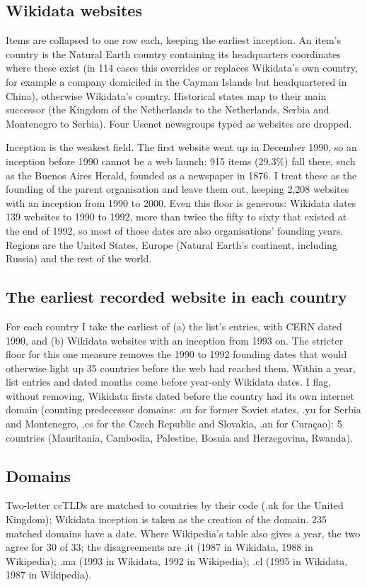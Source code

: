 \documentclass[11pt,a4paper]{article}
\begin{document}
\subsection{Wikidata websites}
Items are collapsed to one row each, keeping the earliest inception. An item's country is the Natural Earth country containing its headquarters coordinates where these exist (in 114 cases this overrides or replaces Wikidata's own country, for example a company domiciled in the Cayman Islands but headquartered in China), otherwise Wikidata's country. Historical states map to their main successor (the Kingdom of the Netherlands to the Netherlands, Serbia and Montenegro to Serbia). Four Usenet newsgroups typed as websites are dropped.

Inception is the weakest field. The first website went up in December 1990, so an inception before 1990 cannot be a web launch: 915 items (29.3\%) fall there, such as the Buenos Aires Herald, founded as a newspaper in 1876. I treat these as the founding of the parent organisation and leave them out, keeping 2,208 websites with an inception from 1990 to 2000. Even this floor is generous: Wikidata dates 139 websites to 1990 to 1992, more than twice the fifty to sixty that existed at the end of 1992, so most of those dates are also organisations' founding years. Regions are the United States, Europe (Natural Earth's continent, including Russia) and the rest of the world.

\subsection{The earliest recorded website in each country}
For each country I take the earliest of (a) the list's entries, with CERN dated 1990, and (b) Wikidata websites with an inception from 1993 on. The stricter floor for this one measure removes the 1990 to 1992 founding dates that would otherwise light up 35 countries before the web had reached them. Within a year, list entries and dated months come before year-only Wikidata dates. I flag, without removing, Wikidata firsts dated before the country had its own internet domain (counting predecessor domains: .su for former Soviet states, .yu for Serbia and Montenegro, .cs for the Czech Republic and Slovakia, .an for Curaçao): 5 countries (Mauritania, Cambodia, Palestine, Bosnia and Herzegovina, Rwanda).

\subsection{Domains}
Two-letter ccTLDs are matched to countries by their code (.uk for the United Kingdom); Wikidata inception is taken as the creation of the domain. 235 matched domains have a date. Where Wikipedia's table also gives a year, the two agree for 30 of 33; the disagreements are .it (1987 in Wikidata, 1988 in Wikipedia); .ma (1993 in Wikidata, 1992 in Wikipedia); .cl (1995 in Wikidata, 1987 in Wikipedia).
\end{document}
